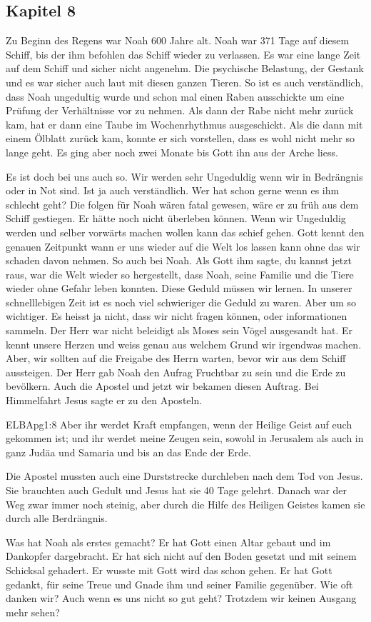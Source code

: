 \subsection{Kapitel 8}
Zu Beginn des Regens war Noah 600 Jahre alt. Noah war 371 Tage auf diesem Schiff, bis der \herr ihm befohlen das Schiff wieder zu verlassen. Es war eine lange Zeit auf dem Schiff und sicher nicht angenehm. Die psychische Belastung, der Gestank und es war sicher auch laut mit diesen ganzen Tieren. So ist es auch verständlich, dass Noah ungedultig wurde und schon mal einen Raben ausschickte um eine Prüfung der Verhältnisse vor zu nehmen. Als dann der Rabe nicht mehr zurück kam, hat er dann eine Taube im Wochenrhythmus ausgeschickt. Als die dann mit einem Ölblatt zurück kam, konnte er sich vorstellen, dass es wohl nicht mehr so lange geht. Es ging aber noch zwei Monate bis Gott ihn aus der Arche liess.

Es ist doch bei uns auch so. Wir werden sehr Ungeduldig wenn wir in Bedrängnis oder in Not sind. Ist ja auch verständlich. Wer hat schon gerne wenn es ihm schlecht geht? Die folgen für Noah wären fatal gewesen, wäre er zu früh aus dem Schiff gestiegen. Er hätte noch nicht überleben können. Wenn wir Ungeduldig werden und selber vorwärts machen wollen kann das schief gehen. Gott kennt den genauen Zeitpunkt wann er uns wieder auf die Welt los lassen kann ohne das wir schaden davon nehmen. So auch bei Noah. Als Gott ihm sagte, du kannst jetzt raus, war die Welt wieder so hergestellt, dass Noah, seine Familie und die Tiere wieder ohne Gefahr leben konnten. Diese Geduld müssen wir lernen. In unserer schnelllebigen Zeit ist es noch viel schwieriger die Geduld zu waren. Aber um so wichtiger. Es heisst ja nicht, dass wir nicht fragen können, oder informationen sammeln. Der Herr war nicht beleidigt als Moses sein Vögel ausgesandt hat. Er kennt unsere Herzen und weiss genau aus welchem Grund wir irgendwas machen. Aber, wir sollten auf die Freigabe des Herrn warten, bevor wir aus dem Schiff aussteigen. Der Herr gab Noah den Aufrag Fruchtbar zu sein und die Erde zu bevölkern. Auch die Apostel und jetzt wir bekamen diesen Auftrag. Bei Himmelfahrt Jesus sagte er zu den Aposteln. 
\begin{bibeltext}{ELB}{Apg}{1:8}
	Aber ihr werdet Kraft empfangen, wenn der Heilige Geist auf euch gekommen ist; und ihr werdet meine Zeugen sein, sowohl in Jerusalem als auch in ganz Judäa und Samaria und bis an das Ende der Erde.
\end{bibeltext} 
Die Apostel mussten auch eine Durststrecke durchleben nach dem Tod von Jesus. Sie brauchten auch Gedult und Jesus hat sie 40 Tage gelehrt. Danach war der Weg zwar immer noch steinig, aber durch die Hilfe des Heiligen Geistes kamen sie durch alle Berdrängnis.

Was hat Noah als erstes gemacht? Er hat Gott einen Altar gebaut und im Dankopfer dargebracht. Er hat sich nicht auf den Boden gesetzt und mit seinem Schicksal gehadert. Er wusste mit Gott wird das schon gehen. Er hat Gott gedankt, für seine Treue und Gnade ihm und seiner Familie gegenüber. Wie oft danken wir? Auch wenn es uns nicht so gut geht? Trotzdem wir keinen Ausgang mehr sehen?